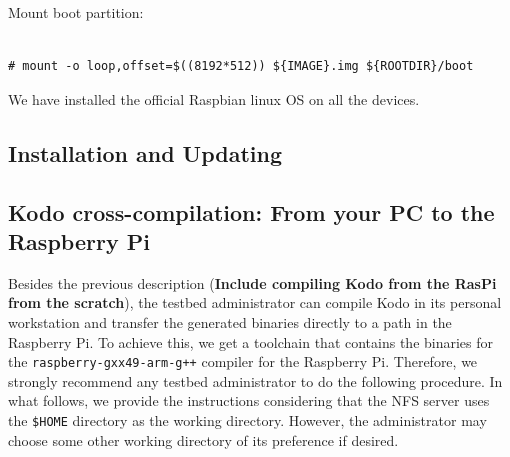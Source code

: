 Mount boot partition:
\begin{lstlisting}[]  % Start your code-block

# mount -o loop,offset=$((8192*512)) ${IMAGE}.img ${ROOTDIR}/boot
\end{lstlisting}
\FloatBarrier



We have installed the official Raspbian linux \ac{OS} on all the devices.



\subsection{Installation and Updating}
\subsection{Kodo cross-compilation: From your PC to the Raspberry Pi}

Besides the previous description (\textbf{Include compiling Kodo from the
RasPi from the scratch}), the testbed administrator can compile Kodo in its
personal workstation and transfer the generated binaries directly to
a path in the Raspberry Pi. To achieve this, we get a toolchain that
contains the binaries for the \texttt{raspberry-gxx49-arm-g++} compiler
for the Raspberry Pi. Therefore, we strongly recommend any testbed
administrator to do the following procedure. In what follows, we provide
the instructions considering that the NFS server uses the \texttt{\$HOME}
directory as the working directory. However, the administrator may choose
some other working directory of its preference if desired.

